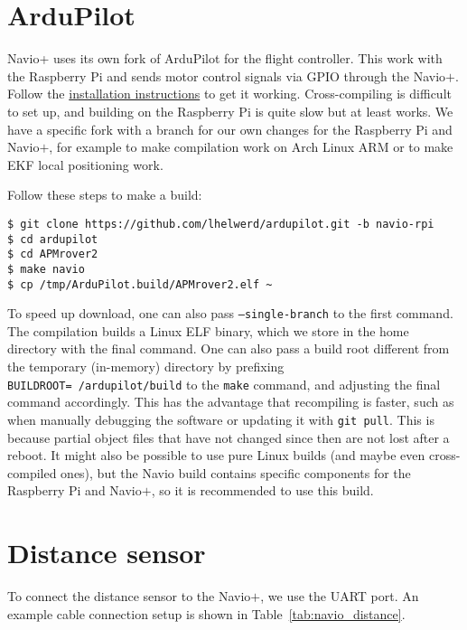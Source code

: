\documentclass{article}
\newcommand{\navio}{Navio$\stackrel{}{+}$}
\begin{document}
\section{ArduPilot}
Navio+ uses its own fork of ArduPilot for the flight controller. This work with 
the Raspberry Pi and sends motor control signals via GPIO through the \navio{}.
Follow the \href{http://docs.emlid.com/navio/Navio-APM/building-from-sources/}{ 
installation instructions} to get it working. Cross-compiling is difficult to 
set up, and building on the Raspberry Pi is quite slow but at least works. We 
have a specific fork with a branch for our own changes for the Raspberry Pi and 
\navio{}, for example to make compilation work on Arch Linux ARM or to make EKF 
local positioning work.

Follow these steps to make a build:

\begin{verbatim}
$ git clone https://github.com/lhelwerd/ardupilot.git -b navio-rpi
$ cd ardupilot
$ cd APMrover2
$ make navio
$ cp /tmp/ArduPilot.build/APMrover2.elf ~
\end{verbatim}

To speed up download, one can also pass {\tt --single-branch} to the first 
command. The compilation builds a Linux ELF binary, which we store in the home 
directory with the final command. One can also pass a build root different from 
the temporary (in-memory) directory by prefixing {\tt 
BUILDROOT=~/ardupilot/build} to the {\tt make} command, and adjusting the final 
command accordingly. This has the advantage that recompiling is faster, such as 
when manually debugging the software or updating it with {\tt git pull}. This 
is because partial object files that have not changed since then are not lost 
after a reboot. It might also be possible to use pure Linux builds (and maybe 
even cross-compiled ones), but the Navio build contains specific components for 
the Raspberry Pi and \navio{}, so it is recommended to use this build.

\section{Distance sensor}

To connect the distance sensor to the \navio{}, we use the UART port. An 
example cable connection setup is shown in Table~\ref{tab:navio_distance}.
\end{document}
